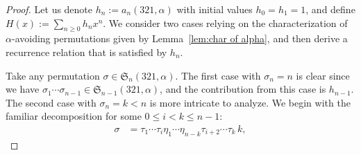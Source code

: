 \documentclass[12pt]{amsart}
\numberwithin{equation}{section}
\theoremstyle{plain}
\def\fS{\mathfrak{S}}
\begin{document}
\begin{proof}
Let us denote $h_n:=a_n(321,\alpha)$ with initial values $h_0=h_1=1$, and define $H(x):=\sum_{n\ge 0}h_nx^n$. 
We consider two cases relying on the characterization of $\alpha$-avoiding permutations given by Lemma~\ref{lem:char of alpha}, and then derive a recurrence relation that is satisfied by $h_n$.

Take any permutation $\sigma\in\fS_n(321,\alpha)$. The first case with $\sigma_n=n$ is clear since we have $\sigma_1\cdots\sigma_{n-1}\in\fS_{n-1}(321,\alpha)$, and the contribution from this case is $h_{n-1}$. The second case with $\sigma_n=k<n$ is more intricate to analyze. We begin with the familiar decomposition for some $0\le i<k\le n-1$:
\begin{align*}
\sigma &= \tau_1\cdots\tau_i \eta_1\cdots\eta_{n-k}\tau_{i+2}\cdots\tau_k\, k,
\end{align*}


\end{proof}
\end{document}
